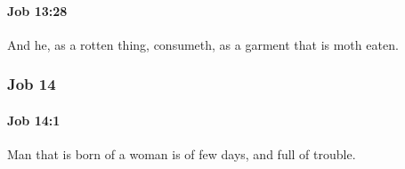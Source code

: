 		\paragraph{Job 13:28} %
			\label{JOB-13-28}

			And he, as a rotten thing, consumeth, as a garment that is moth eaten.

	\subsubsection{Job 14} %
		\label{JOB-14}

		\paragraph{Job 14:1} %
			\label{JOB-14-1}

			Man that is born of a woman is of few days, and full of trouble.


